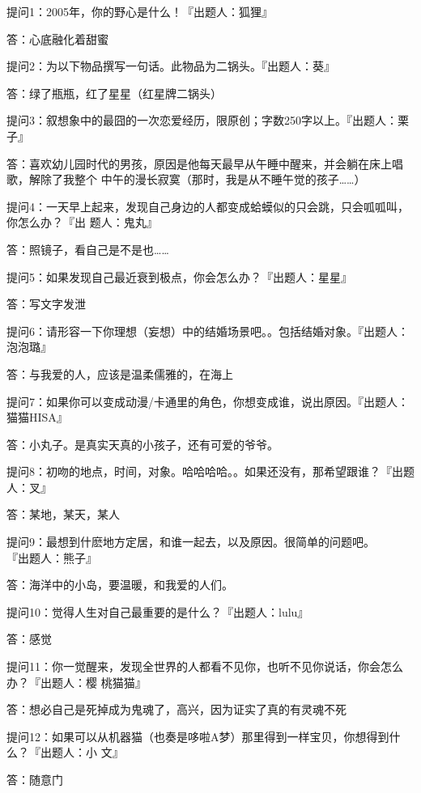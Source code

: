 \documentclass[12pt,a4paper]{article}
\def\blankrev{\vspace{1ex}}									%
\begin{document}
		提问1：2005年，你的野心是什么！『出题人：狐狸』\par
		答：心底融化着甜蜜

		\blankrev
		提问2：为以下物品撰写一句话。此物品为二锅头。『出题人：葵』\par
		答：绿了瓶瓶，红了星星（红星牌二锅头）

		\blankrev
		提问3：叙想象中的最囧的一次恋爱经历，限原创；字数250字以上。『出题人：栗子』\par
		答：喜欢幼儿园时代的男孩，原因是他每天最早从午睡中醒来，并会躺在床上唱歌，解除了我整个
			中午的漫长寂寞（那时，我是从不睡午觉的孩子……）

		\blankrev
		提问4：一天早上起来，发现自己身边的人都变成蛤蟆似的只会跳，只会呱呱叫，你怎么办？『出
				题人：鬼丸』\par
		答：照镜子，看自己是不是也……

		\blankrev
		提问5：如果发现自己最近衰到极点，你会怎么办？『出题人：星星』\par
		答：写文字发泄

		\blankrev
		提问6：请形容一下你理想（妄想）中的结婚场景吧。。包括结婚对象。『出题人：泡泡璐』\par
		答：与我爱的人，应该是温柔儒雅的，在海上

		\blankrev
		提问7：如果你可以变成动漫/卡通里的角色，你想变成谁，说出原因。『出题人：猫猫HISA』\par
		答：小丸子。是真实天真的小孩子，还有可爱的爷爷。

		\blankrev
		提问8：初吻的地点，时间，对象。哈哈哈哈。。如果还没有，那希望跟谁？『出题人：叉』\par
		答：某地，某天，某人

		\blankrev
		提问9：最想到什麽地方定居，和谁一起去，以及原因。很简单的问题吧。\\『出题人：熊子』\par
		答：海洋中的小岛，要温暖，和我爱的人们。

		\blankrev
		提问10：觉得人生对自己最重要的是什么？『出题人：lulu』\par
		答：感觉

		\blankrev
		提问11：你一觉醒来，发现全世界的人都看不见你，也听不见你说话，你会怎么办？『出题人：樱
				桃猫猫』\par
		答：想必自己是死掉成为鬼魂了，高兴，因为证实了真的有灵魂不死

		\blankrev
		提问12：如果可以从机器猫（也奏是哆啦A梦）那里得到一样宝贝，你想得到什么？『出题人：小
				文』\par
		答：随意门
\end{document}
